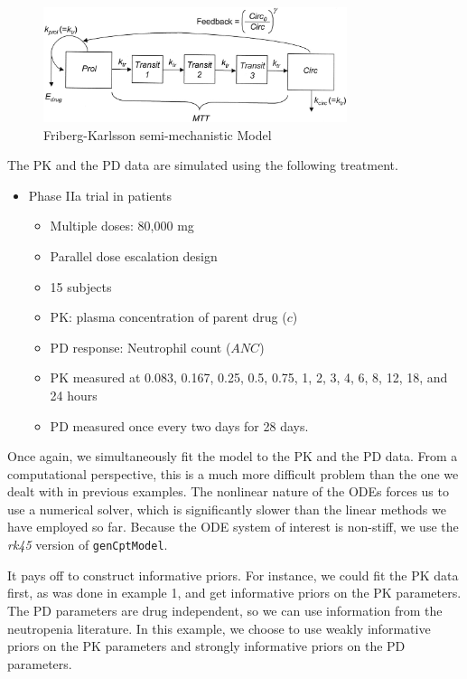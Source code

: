 \documentclass[11pt]{amsart}
\begin{document}
\begin{figure}[htbp]
\includegraphics[width=3.5in,trim=0in 0in 0 0in]{graphics/neutrophilModel.jpg}
\caption{Friberg-Karlsson semi-mechanistic Model \cite{2364}}
\label{FK}
\end{figure}

The PK and the PD data are simulated using the following treatment.
\begin{itemize}
  \item Phase IIa trial in patients
  \begin{itemize}
    \item Multiple doses: 80,000 mg
    \item Parallel dose escalation design
    \item 15 subjects
    \item PK: plasma concentration of parent drug ($c$)
    \item PD response: Neutrophil count ($ANC$)
    \item PK measured at 0.083, 0.167, 0.25, 0.5, 0.75, 1, 2, 3, 4, 6, 8, 12, 18, and 24 hours
    \item PD measured once every two days for 28 days.
  \end{itemize}
\end{itemize}

Once again, we simultaneously fit the model to the PK and the PD data. From a computational perspective, this is a much more difficult problem than the one we dealt with in previous examples. The nonlinear nature of the ODEs forces us to use a numerical solver, which is significantly slower than the linear methods we have employed so far. Because the ODE system of interest is non-stiff, we use the \textit{rk45} version of \texttt{genCptModel}.

It pays off to construct informative priors. For instance, we could fit the PK data first, as was done in  example 1, and get informative priors on the PK parameters. The PD parameters are drug independent, so we can use information from the neutropenia literature. In this example, we choose to use weakly informative priors on the PK parameters and strongly informative priors on the PD parameters. 
\end{document}
